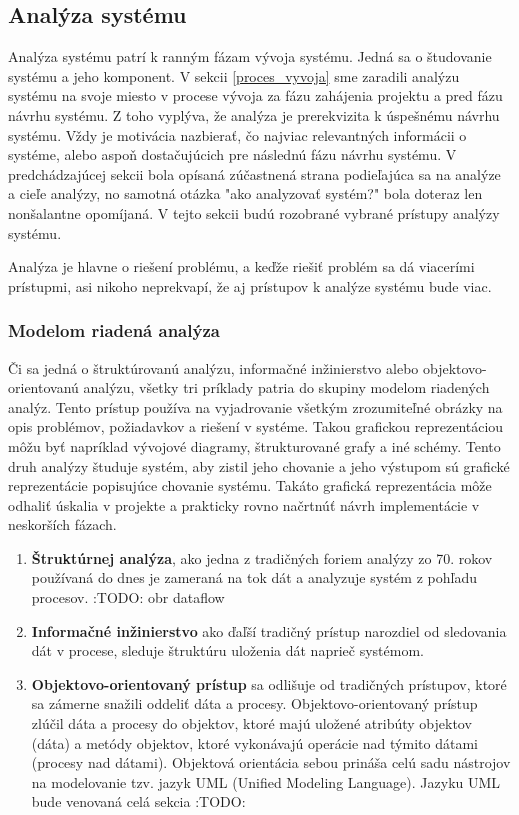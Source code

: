 \subsection{Analýza systému}
Analýza systému patrí k ranným fázam vývoja systému. Jedná sa o študovanie systému a jeho komponent.
 V sekcii \ref{proces_vyvoja} sme zaradili analýzu systému na svoje miesto v procese vývoja za fázu zahájenia projektu a pred fázu návrhu systému. Z toho vyplýva, že analýza je prerekvizita k úspešnému návrhu systému. Vždy je motivácia nazbierať, čo najviac relevantných informácii o systéme, alebo aspoň dostačujúcich pre následnú fázu návrhu systému.
 V predchádzajúcej sekcii bola opísaná zúčastnená strana podieľajúca sa na analýze a cieľe analýzy, no samotná otázka "ako analyzovať systém?" bola doteraz len nonšalantne opomíjaná. V tejto sekcii budú rozobrané vybrané prístupy analýzy systému.

Analýza je hlavne o riešení problému, a keďže riešiť problém sa dá viacerími prístupmi, asi nikoho neprekvapí, že aj prístupov k analýze systému bude viac.

\subsubsection{Modelom riadená analýza}
Či sa jedná o štruktúrovanú analýzu, informačné inžinierstvo alebo objektovo-orientovanú analýzu, všetky tri príklady patria do skupiny modelom riadených analýz. Tento prístup používa na vyjadrovanie všetkým zrozumiteľné obrázky na opis problémov, požiadavkov a riešení v systéme. Takou grafickou reprezentáciou môžu byť napríklad vývojové diagramy, štrukturované grafy a iné schémy. Tento druh analýzy študuje systém, aby zistil jeho chovanie a jeho výstupom sú grafické reprezentácie popisujúce chovanie systému. Takáto grafická reprezentácia môže odhaliť úskalia v projekte a prakticky rovno načrtnúť návrh implementácie v neskorších fázach.

\begin{enumerate}
	\item \textbf{Štruktúrnej analýza}, ako jedna z tradičných foriem analýzy zo 70. rokov používaná do dnes je zameraná na tok dát a analyzuje systém z pohľadu procesov. :TODO: obr dataflow
	\item \textbf{Informačné inžinierstvo} ako ďaľší tradičný prístup narozdiel od sledovania dát v procese, sleduje štruktúru uloženia dát naprieč systémom.
	\item \textbf{Objektovo-orientovaný prístup} sa odlišuje od tradičných prístupov, ktoré sa zámerne snažili oddeliť dáta a procesy. Objektovo-orientovaný prístup zlúčil dáta a procesy do objektov, ktoré majú uložené atribúty objektov (dáta) a metódy objektov, ktoré vykonávajú operácie nad týmito dátami (procesy nad dátami). Objektová orientácia sebou prináša celú sadu nástrojov na modelovanie tzv. jazyk UML (Unified Modeling Language). Jazyku UML bude venovaná celá sekcia :TODO:
\end{enumerate}

